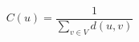 \documentclass[12pt]{article}
\begin{document}
\[
C\left(u\right) =
    \frac{1}{\sum_{v \in V}{d\left(u,v\right)}}
\]
\end{document}
